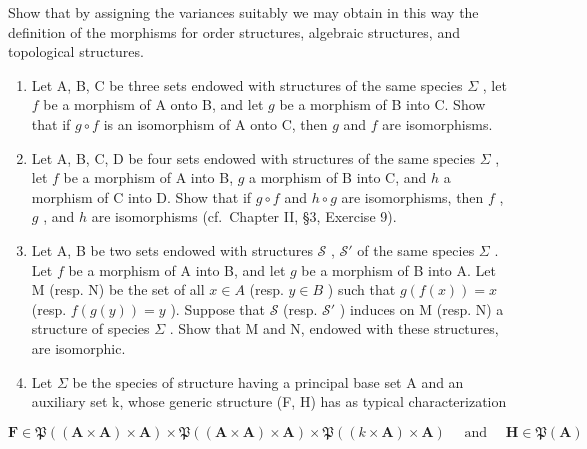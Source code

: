 Show that by assigning the variances suitably we may obtain in this way the definition of the morphisms for order structures, algebraic structures, and topological structures.

\begin{enumerate}
\def\labelenumi{\arabic{enumi}.}
\setcounter{enumi}{2}
\item
  Let A, B, C be three sets endowed with structures of the same species \(\Sigma\) , let \(f\) be a morphism of A onto B, and let \(g\) be a morphism of B into C. Show that if \(g \circ f\) is an isomorphism of A onto C, then \(g\) and \(f\) are isomorphisms.
\item
  Let A, B, C, D be four sets endowed with structures of the same species \(\Sigma\) , let \(f\) be a morphism of A into B, \(g\) a morphism of B into C, and \(h\) a morphism of C into D. Show that if \(g \circ f\) and \(h \circ g\) are isomorphisms, then \(f\) , \(g\) , and \(h\) are isomorphisms (cf.~Chapter II, §3, Exercise 9).
\item
  Let A, B be two sets endowed with structures \(\mathcal{S}\) , \(\mathcal{S}'\) of the same species \(\Sigma\) . Let \(f\) be a morphism of A into B, and let \(g\) be a morphism of B into A. Let M (resp. N) be the set of all \(x \in A\) (resp. \(y \in B\) ) such that \(g(f(x)) = x\) (resp. \(f(g(y)) = y\) ). Suppose that \(\mathcal{S}\) (resp. \(\mathcal{S}'\) ) induces on M (resp. N) a structure of species \(\Sigma\) . Show that M and N, endowed with these structures, are isomorphic.
\item
  Let \(\Sigma\) be the species of structure having a principal base set A and an auxiliary set k, whose generic structure (F, H) has as typical characterization
\end{enumerate}

\[
\mathbf {F} \in \mathfrak {P} ((\mathbf {A} \times \mathbf {A}) \times \mathbf {A}) \times \mathfrak {P} ((\mathbf {A} \times \mathbf {A}) \times \mathbf {A}) \times \mathfrak {P} ((k \times \mathbf {A}) \times \mathbf {A}) \quad \text { and } \quad \mathbf {H} \in \mathfrak {P} (\mathbf {A})
\]

